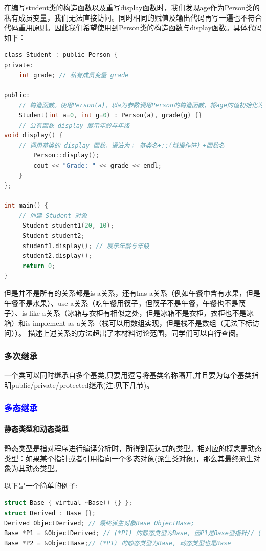 \documentclass[UTF8]{ctexart}
\begin{document}
在编写student类的构造函数以及重写display函数时，我们发现age作为Person类的私有成员变量，我们无法直接访问。同时相同的赋值及输出代码再写一遍也不符合代码重用原则。因此我们希望使用到Person类的构造函数与display函数。具体代码如下：
\begin{lstlisting}[language = C,basicstyle=\small\ttfamily]
class Student : public Person {
private:
    int grade; // 私有成员变量 grade

public:
    // 构造函数。使用Person(a)，以a为参数调用Person的构造函数，将age的值初始化为a
    Student(int a=0, int g=0) : Person(a), grade(g) {} 
    // 公有函数 display 展示年龄与年级
void display() {
    // 调用基类的 display 函数，语法为： 基类名+::(域操作符）+函数名
        Person::display(); 
        cout << "Grade: " << grade << endl;
    }
};

int main() {
    // 创建 Student 对象
     Student student1(20, 10);
     Student student2;
     student1.display(); // 展示年龄与年级
     student2.display();
     return 0;
}
\end{lstlisting}

但是并不是所有的关系都是is-a关系，还有has a关系（例如午餐中含有水果，但是午餐不是水果）、use a关系（吃午餐用筷子，但筷子不是午餐，午餐也不是筷子）、is like a关系（冰箱与衣柜有相似之处，但是冰箱不是衣柜，衣柜也不是冰箱）和is implement as a关系（栈可以用数组实现，但是栈不是数组（无法下标访问））。 描述上述关系的方法超出了本材料讨论范围，同学们可以自行查阅。

\subsubsection{多次继承}
一个类可以同时继承自多个基类,只要用逗号将基类名称隔开,并且要为每个基类指明public/private/protected继承(注:见下几节)。

\subsubsection{\textcolor{blue}{多态继承}}
\paragraph{静态类型和动态类型}静态类型是指对程序进行编译分析时，所得到表达式的类型。相对应的概念是动态类型：如果某个指针或者引用指向一个多态对象(派生类对象)，那么其最终派生对象为其动态类型。

以下是一个简单的例子:
\begin{lstlisting}[language = C,basicstyle=\small\ttfamily]
struct Base { virtual ~Base() {} };
struct Derived : Base {};
Derived ObjectDerived; // 最终派生对象Base ObjectBase;
Base *P1 = &ObjectDerived; // (*P1) 的静态类型为Base, 因P1是Base型指针// (*P1) 的动态类型为Derived, 因其指向一个派生类对象
Base *P2 = &ObjectBase;// (*P1) 的静态类型为Base, 动态类型也是Base
\end{lstlisting}
\end{document}
